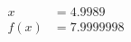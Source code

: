 \documentclass[preview]{standalone}
\begin{document}
\begin{align*}
x &= 4.9989\\f(x) &= 7.9999998
\end{align*}
\end{document}
